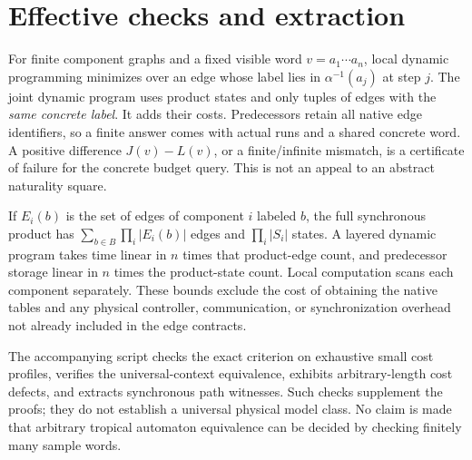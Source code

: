 \documentclass[11pt]{article}
\begin{document}
\section{Effective checks and extraction}
For finite component graphs and a fixed visible word $v=a_1\cdots a_n$, local dynamic programming minimizes over an edge whose label lies in $\alpha^{-1}(a_j)$ at step $j$. The joint dynamic program uses product states and only tuples of edges with the \emph{same concrete label}. It adds their costs. Predecessors retain all native edge identifiers, so a finite answer comes with actual runs and a shared concrete word. A positive difference $J(v)-L(v)$, or a finite/infinite mismatch, is a certificate of failure for the concrete budget query. This is not an appeal to an abstract naturality square.

If $E_i(b)$ is the set of edges of component $i$ labeled $b$, the full synchronous product has
$\sum_{b\in B}\prod_i|E_i(b)|$ edges and $\prod_i|S_i|$ states. A layered dynamic program takes time linear in $n$ times that product-edge count, and predecessor storage linear in $n$ times the product-state count. Local computation scans each component separately. These bounds exclude the cost of obtaining the native tables and any physical controller, communication, or synchronization overhead not already included in the edge contracts.

The accompanying script checks the exact criterion on exhaustive small cost profiles, verifies the universal-context equivalence, exhibits arbitrary-length cost defects, and extracts synchronous path witnesses. Such checks supplement the proofs; they do not establish a universal physical model class. No claim is made that arbitrary tropical automaton equivalence can be decided by checking finitely many sample words.
\end{document}
